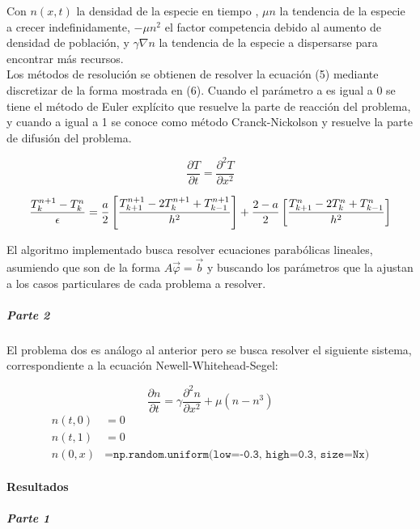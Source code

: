 \documentclass[prl,showpacs]{revtex4-1}
\begin{document}
Con $n(x,t)$ la densidad de la especie en tiempo , $\mu n$ la tendencia de la especie a crecer indefinidamente, $-\mu n^{2}$ el factor competencia debido al aumento de densidad de poblaci\'on, y $\gamma \nabla n$ la tendencia de la especie a dispersarse para encontrar m\'as recursos.\\
Los m\'etodos de resoluci\'on se obtienen de resolver la ecuaci\'on (5) mediante discretizar de la forma mostrada en (6). Cuando el par\'ametro a es igual a 0 se tiene el m\'etodo de Euler expl\'icito que resuelve la parte de reacci\'on del problema, y cuando a igual a 1 se conoce como m\'etodo Cranck-Nickolson y resuelve la parte de difusi\'on del problema.
\begin{center}
\begin{equation}
\frac{\partial T}{\partial t} = \frac{\partial^2 T}{\partial x^2}
\end{equation}
\end{center}
\begin{equation}
\frac{T^{n+1}_{k} - T^{n}_{k}}{\epsilon} =\\
 \frac{a}{2} \left[ \frac{T^{n+1}_{k+1} - 2T^{n+1}_{k}+T^{n+1}_{k-1}}{h^{2}}\right] +  \frac{2-a}{2} \left[ \frac{T^{n}_{k+1} - 2T^{n}_{k}+T^{n}_{k-1}}{h^{2}}\right]
\end{equation}

El algoritmo implementado busca resolver ecuaciones parab\'olicas lineales, asumiendo que son de la forma $A\overrightarrow{\varphi}=\overrightarrow{b}$ y buscando los par\'ametros que la ajustan a los casos particulares de cada problema a resolver.

\subparagraph{Parte 2}
El problema dos es an\'alogo al anterior pero se busca resolver el siguiente sistema, correspondiente a la ecuaci\'on Newell-Whitehead-Segel:

\begin{equation}
\frac{\partial n}{\partial t} = \gamma \frac{\partial^2n}{\partial x^2} + \mu ( n - n^3)
\end{equation}
\begin{eqnarray}
n(t, 0) &= 0\\ n(t, 1) &= 0\\ n(0, x) &= \texttt{np.random.uniform(low=-0.3, high=0.3, size=Nx)}
\end{eqnarray}

\paragraph{Resultados}
\subparagraph{Parte 1}
\end{document}
